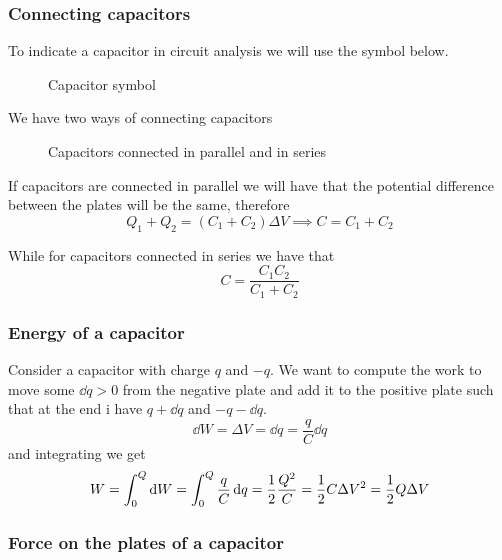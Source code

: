 \documentclass[12pt]{extarticle}
\begin{document}
\subsubsection{Connecting capacitors}

To indicate a capacitor in circuit analysis we will use the symbol below.

\begin{figure}[H]
	\centering
	
	\caption{Capacitor symbol}
\end{figure}

We have two ways of connecting capacitors
\begin{figure}[H]
	\centering
	
	\caption{Capacitors connected in parallel and in series}
\end{figure}

If capacitors are connected in parallel we will have that the potential difference between the plates will be the same, therefore
\begin{equation}
	Q_1 + Q_2 = (C_1 + C_2) \Delta V \implies C = C_1 + C_2
\end{equation}

While for capacitors connected in series we have that
\begin{equation}
	C = \frac{C_1 C_2}{C_1 + C_2}
\end{equation}

\subsubsection{Energy of a capacitor}

Consider a capacitor with charge $q$ and $-q$.
We want to compute the work to move some $\dd{q} > 0$ from the negative plate and add it to the positive plate such that at the end i have $q + \dd{q}$ and $-q - \dd{q}$.
\begin{equation}
	\dd{W} = \Delta V = \dd{q} = \frac{q}{C} \dd{q}
\end{equation}
and integrating we get
\begin{equation}
	W = \int_0^Q \dd{W} = \int^Q_0 \frac{q}{C} \dd{q} = \frac{1}{2} \frac{Q^2}{C}= \frac{1}{2} C \Delta V^2 = \frac{1}{2} Q \Delta V
\end{equation}

\subsubsection{Force on the plates of a capacitor}
\end{document}
